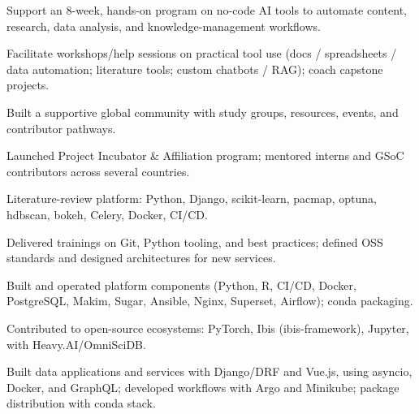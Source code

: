 \documentclass[10pt,a4paper]{article}
\begin{document}
\begin{tightitemize}
  \item Support an 8-week, hands-on program on no-code AI tools to automate content, research, data analysis, and knowledge-management workflows.
  \item Facilitate workshops/help sessions on practical tool use (docs / spreadsheets / data automation; literature tools; custom chatbots / RAG); coach capstone projects.
\end{tightitemize}

\begin{tightitemize}
  \item Built a supportive global community with study groups, resources, events, and contributor pathways.
  \item Launched Project Incubator \& Affiliation program; mentored interns and GSoC contributors across several countries.
\end{tightitemize}

\begin{tightitemize}
  \item Literature-review platform: Python, Django, scikit-learn, pacmap, optuna, hdbscan, bokeh, Celery, Docker, CI/CD.
\end{tightitemize}

\begin{tightitemize}
  \item Delivered trainings on Git, Python tooling, and best practices; defined OSS standards and designed architectures for new services.
  \item Built and operated platform components (Python, R, CI/CD, Docker, PostgreSQL, Makim, Sugar, Ansible, Nginx, Superset, Airflow); conda packaging.
\end{tightitemize}

\begin{tightitemize}
  \item Contributed to open-source ecosystems: PyTorch, Ibis (ibis-framework), Jupyter, with Heavy.AI/OmniSciDB.
  \item Built data applications and services with Django/DRF and Vue.js, using asyncio, Docker, and GraphQL; developed workflows with Argo and Minikube; package distribution with conda stack.
\end{tightitemize}
\end{document}

